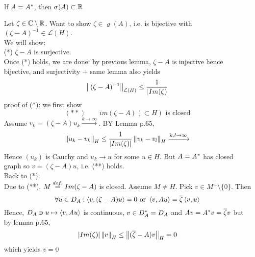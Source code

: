 \documentclass{article}
\begin{document}
\begin{proposition}
	If $A={A}^*$, then $\sigma(A)\subset \mathbb{R}$
	\begin{pf}{}{}
		Let $\zeta\in\mathbb{C}\setminus\mathbb{R}$. Want to show $\zeta\in\varrho(A)$, i.e.  is bijective with $(\zeta-A)^{-1}\in\mathcal{L}(H)$.\\
		We will show:\\
		(*) $\zeta-A$ is surjective.\\
		Once  (*) holds, we are done: by previous lemma, $\zeta-A$ is injective hence bijective, and surjectivity + same lemma also yields
		$$
			\left\|{(\zeta-A)^{-1}}\right\|_{\mathcal{L}(H)}\leq\frac{1}{|Im(\zeta)}
		$$
		proof of (*): we first show
		$$
			(**)\qquad im(\zeta-A)(\subset H) \text{  is closed}
		$$
		Assume $v_k=(\zeta-A)u_k\xrightarrow{k\to\infty}$. BY Lemma p.65,
		$$
			\left\|{u_k-v_k}\right\|_H\leq\frac{1}{|Im(\zeta)|}\left\|{v_k-v_l}\right\|_H\xrightarrow{k,l\to\infty}$$Hence $(u_k)$ is Cauchy and $u_k\to u$ for some $u\in H$. But $A={A}^*$ has closed graph so $v=(\zeta-A)u$, i.e. (**) holds.\\
		Back to (*):\\
		Due to (**), $M\stackrel{def.}{=} Im(\zeta-A)$ is closed. Assume $M\neq H$. Pick $v\in M^\perp\setminus\{0\}$. Then
		$$
			\forall u\in D_A:\left<{v},{(\zeta-A)u}\right>=0\text{  or  }\left<{v},{Au}\right>=\overline{\zeta}\left<{v},{u}\right>$$
		Hence,
		$
			D_A\ni u\mapsto \left<{v},{Au}\right>
		$
		is continuous, $v\in D_{A}^*=D_A$ and $Av={A}^*v=\overline{\zeta}v$
		but by lemma p.65,
		$$|Im(\zeta)|\left\|{v}\right\|_H\leq\left\|{(\overline{\zeta}-A)v}\right\|_H=0$$
		which yields $v=0 $
	\end{pf}
\end{proposition}
\end{document}
